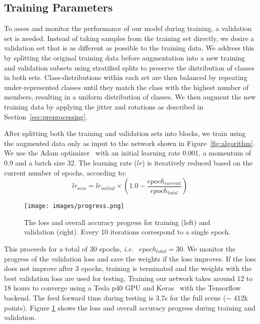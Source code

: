 \documentclass[final,3p,times,twocolumn,authoryear]{elsarticle}
\newcommand{\ie}{\textit{i}.\textit{e}.}
\begin{document}
\subsection{Training Parameters}
\label{sec:training_parameters}
To asses and monitor the performance of our model during training, a validation set is needed.
Instead of taking samples from the training set directly, we desire a validation set that is as different as possible to the training data.
We address this by splitting the original training data before augmentation into a new training and validation subsets using stratified splits to preserve the distribution of classes in both sets. 
Class-distributions within each set are then balanced by repeating under-represented classes until they match the class with the highest number of members, resulting in a uniform distribution of classes. 
We then augment the new training data by applying the jitter and rotations as described in Section~\ref{sec:preprocessing}. 

After splitting both the training and validation sets into blocks, we train using the augmented data only as input to the network shown in Figure~\ref{fig:algorithm}. 
We use the Adam optimizer~\citep{Kingma2014AdamAM} with an initial learning rate 0.001, a momentum of 0.9 and a batch size 32. 
The learning rate ($lr$) is iteratively reduced based on the current number of epochs, according to:
\begin{equation}
\label{eq:lr}
lr_{new} = lr_{initial}\times(1.0-\frac{epoch_{current}}{epoch_{total}})
\end{equation}
\begin{figure}[t]
\begin{center}
\texttt{[image: images/progress.png]}
\end{center}
\caption{The loss and overall accuracy progress for training (left) and validation (right). Every 10 iterations correspond to a single epoch.}
\label{fig:progress}
\end{figure}
This proceeds for a total of 30 epochs, \ie~ $epoch_{total} = 30$. 
We monitor the progress of the validation loss and save the weights if the loss improves. 
If the loss does not improve after 3 epochs, training is terminated and the weights with the best validation loss are used for testing. 
Training our network takes around 12 to 18 hours to converge using a Tesla p40 GPU and Keras~\citep{keras} with the Tensorflow backend.
The feed forward time during testing is 3.7s for the full scene ($\sim$ 412k points).  
Figure \ref{fig:progress} shows the loss and overall accuracy progress during training and validation.
\end{document}
